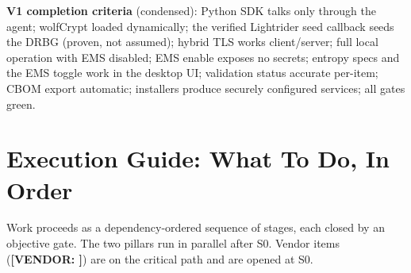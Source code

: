\documentclass[10pt]{article}
\newcommand{\dep}[1]{\textcolor{warnred}{\sffamily\bfseries\small [VENDOR: #1]}}
\begin{document}
\textbf{V1 completion criteria} (condensed): Python SDK talks only through the agent;
wolfCrypt loaded dynamically; the verified Lightrider seed callback seeds the DRBG
(proven, not assumed); hybrid TLS works client/server;
full local operation with EMS disabled; EMS enable exposes no secrets; entropy specs and
the EMS toggle work in the desktop UI; validation status
accurate per-item; CBOM export automatic; installers produce securely configured
services; all gates green.

\section{Execution Guide: What To Do, In Order}\label{sec:schedule}

Work proceeds as a dependency-ordered sequence of stages, each closed by an objective
gate. The two pillars run in parallel after S0. Vendor items (\dep{}) are on the critical
path and are opened at S0.
\end{document}
